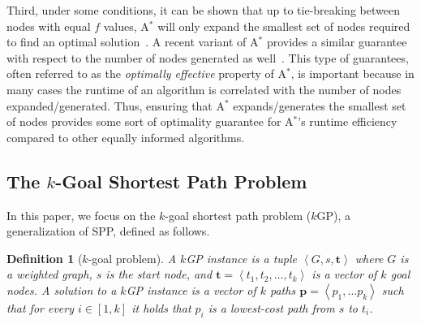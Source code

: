 \documentclass[twoside,11pt]{article}
\newtheorem{definition}[theorem]{Definition}
\newcommand{\kgs}{$k$GP\xspace}
\newcommand{\astar}{A$^*$\xspace}
\newcommand{\tuple}[1]{\ensuremath{\left \langle #1 \right \rangle }}
\newcommand{\vect}[1]{\mathbf{#1}}
\newcommand{\roni}[1]{\textbf{[RS:#1]}}
\begin{document}

Third, under some conditions, it can be shown that up to tie-breaking between nodes with equal $f$ values, \astar will only expand the smallest set of nodes required to find an optimal solution~\cite{dechter1985generalizedBestFirst}. 
A recent variant of \astar provides a similar guarantee with respect to the number of nodes generated as well~\cite{goldenberg2013optimal}. 
This type of guarantees, often referred to as the \emph{optimally effective} property of \astar, is important because in many cases the runtime of an algorithm is correlated with the number of nodes expanded/generated. 
Thus, ensuring that \astar expands/generates the smallest set of nodes provides some sort of optimality guarantee for \astar's runtime efficiency compared to other equally informed algorithms.



\subsection{The $k$-Goal Shortest Path Problem}

In this paper, we focus on the $k$-goal shortest path problem (\kgs), a generalization of SPP, defined as follows. 
\begin{definition}[$k$-goal problem]
  \label{def:k-goal}
  A \emph{\kgs instance} is a tuple $\tuple{G, s, \vect{t}}$ where $G$ is a weighted graph, $s$ is the start node, and $\vect{t}=\tuple{t_1, t_2,\ldots, t_k}$ is a vector of $k$ \emph{goal nodes}. %
  A \emph{solution} to a \kgs instance is a vector of $k$ paths $\vect{p}=\tuple{p_1, \ldots p_k}$ such that for every  $i\in [1, k]$ it holds that $p_i$ is a lowest-cost path from $s$ to $t_i$.
\end{definition}
\end{document}
